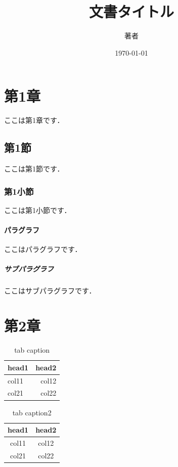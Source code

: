 \documentclass[a4paper,11pt]{jarticle}
\title{文書タイトル}
\author{著者}
\date{\today}
\begin{document}
    \maketitle

    \clearpage
    \tableofcontents

    \clearpage
    \section{第1章}
        ここは第1章です．
        \subsection{第1節}
            ここは第1節です．
            \subsubsection{第1小節}
                ここは第1小節です．
                \paragraph{パラグラフ}
                    ここはパラグラフです．
                    \subparagraph{サブパラグラフ}
                        \label{sec:subparagraph}
                        ここはサブパラグラフです．

    \cleardoublepage
    \section{第2章}
        \begin{table}[h]
            \centering
            \caption{tab caption}
            \begin{tabular}{lr} \hline
                head1 & head2 \\\hline
                col11 & col12 \\
                col21 & col22 \\\hline
            \end{tabular}
            \label{tab:table}
        \end{table}

        \begin{table}[h]
            \caption{tab caption2}
            \begin{tabular}{cc} \toprule
                head1 & head2 \\\midrule
                col11 & col12 \\
                col21 & col22 \\\bottomrule
            \end{tabular}
            \label{tab:table2}
        \end{table}
\end{document}
